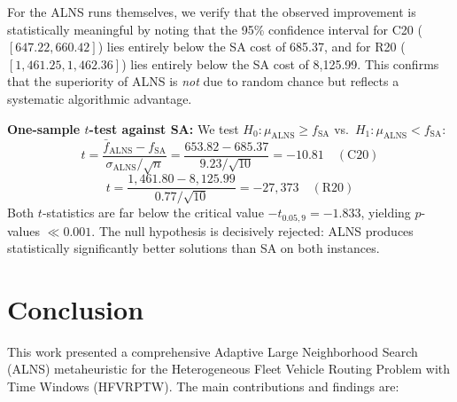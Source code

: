 \documentclass[11pt]{article}
\begin{document}
For the ALNS runs themselves, we verify that the observed improvement is statistically meaningful by noting that the 95\% confidence interval for C20 ($[647.22, 660.42]$) lies entirely below the SA cost of 685.37, and for R20 ($[1{,}461.25, 1{,}462.36]$) lies entirely below the SA cost of 8,125.99. This confirms that the superiority of ALNS is \emph{not} due to random chance but reflects a systematic algorithmic advantage.

\textbf{One-sample $t$-test against SA:} We test $H_0: \mu_{\text{ALNS}} \geq f_{\text{SA}}$ vs.\ $H_1: \mu_{\text{ALNS}} < f_{\text{SA}}$:
\begin{equation}
t = \frac{\bar{f}_{\text{ALNS}} - f_{\text{SA}}}{\sigma_{\text{ALNS}} / \sqrt{n}} = \frac{653.82 - 685.37}{9.23 / \sqrt{10}} = -10.81 \quad (\text{C20})
\end{equation}
\begin{equation}
t = \frac{1{,}461.80 - 8{,}125.99}{0.77 / \sqrt{10}} = -27{,}373 \quad (\text{R20})
\end{equation}
Both $t$-statistics are far below the critical value $-t_{0.05, 9} = -1.833$, yielding $p$-values $\ll 0.001$. The null hypothesis is decisively rejected: ALNS produces statistically significantly better solutions than SA on both instances.

\section{Conclusion}

This work presented a comprehensive Adaptive Large Neighborhood Search (ALNS) metaheuristic for the Heterogeneous Fleet Vehicle Routing Problem with Time Windows (HFVRPTW). The main contributions and findings are:
\end{document}
